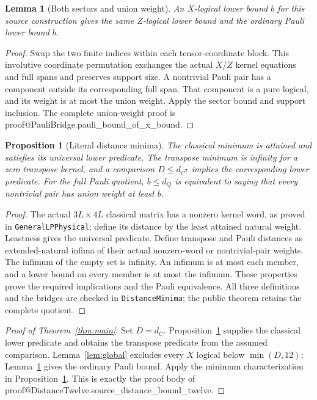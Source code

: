 \documentclass[11pt]{article}
\makeatletter
\newtheorem{lemma}[theorem]{Lemma}
\newtheorem{proposition}[theorem]{Proposition}
\theoremstyle{definition}\newtheorem{definition}[theorem]{Definition}
\newcommand{\lean}[2]{\csname proof@#1.#2\endcsname}
\makeatother
\begin{document}
\begin{lemma}[Both sectors and union weight]\label{lem:pauli}
An $X$-logical lower bound $b$ for this source construction gives the same
$Z$-logical lower bound and the ordinary Pauli lower bound $b$.
\end{lemma}
\begin{proof}
Swap the two finite indices within each tensor-coordinate block.
This involutive coordinate permutation exchanges the actual $X$/$Z$ kernel
equations and full spans and preserves support size. A nontrivial Pauli pair
has a component outside its corresponding full span. That component is a
pure logical, and its weight is at most the union weight. Apply the sector
bound and support inclusion. The complete union-weight proof is
\lean{PauliBridge}{pauli_bound_of_x_bound}.
\end{proof}

\begin{proposition}[Literal distance minima]\label{prop:minima}
The classical minimum is attained and satisfies its universal lower predicate.
The transpose minimum is infinity for a zero transpose kernel, and a comparison
$D\leq d_{C^{\mathsf T}}$ implies the corresponding lower predicate.
For the full Pauli quotient, $b\leq d_Q$ is equivalent to saying that every
nontrivial pair has union weight at least $b$.
\end{proposition}
\begin{proof}
The actual $3L\times4L$ classical matrix has a nonzero kernel word, as proved
in \texttt{GeneralLPPhysical}; define its distance by the least attained
natural weight. Leastness gives the universal predicate. Define transpose
and Pauli distances as extended-natural infima of their actual nonzero-word
or nontrivial-pair weights. The infimum of the empty set is infinity.
An infimum is at most each member, and a lower bound on every member is at
most the infimum. These properties prove the required implications and the
Pauli equivalence. All three definitions and the bridges are checked in
\texttt{DistanceMinima}; the public theorem retains the complete quotient.
\end{proof}

\begin{proof}[Proof of Theorem~\ref{thm:main}]
Set $D=d_C$. Proposition~\ref{prop:minima} supplies the classical lower
predicate and obtains the transpose predicate from the assumed comparison.
Lemma~\ref{lem:global} excludes every $X$ logical below $\min(D,12)$;
Lemma~\ref{lem:pauli} gives the ordinary Pauli bound. Apply the minimum
characterization in Proposition~\ref{prop:minima}. This is exactly the
proof body of \lean{DistanceTwelve}{source_distance_bound_twelve}.
\end{proof}
\end{document}

